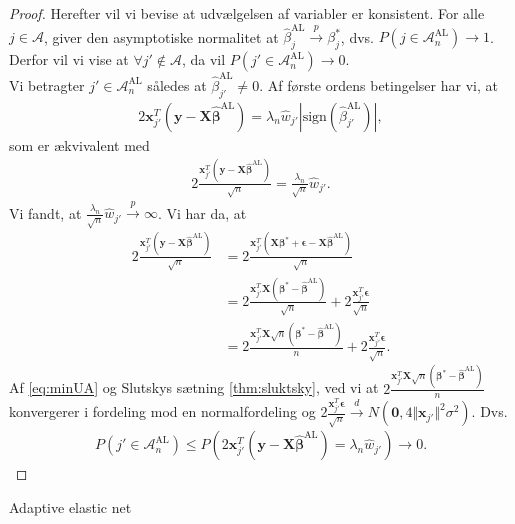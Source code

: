 \begin{proof}
Herefter vil vi bevise at udvælgelsen af variabler er konsistent. For alle $j \in \mathcal{A}$, giver den asymptotiske normalitet at $\hat{\beta}_j^{\text{AL}} \overset{p}{\rightarrow}\beta_j^{*}$, dvs. $P(j \in \mathcal{A}_n^{\text{AL}}) \rightarrow 1$. Derfor vil vi vise at $\forall j' \notin \mathcal{A}$, da vil $P(j' \in \mathcal{A}_n^{\text{AL}}) \rightarrow 0$. \\
Vi betragter $j' \in \mathcal{A}_n^{\text{AL}}$ således at $\hat{\beta}_{j'}^{\text{AL}} \neq 0$. Af første ordens betingelser har vi, at 
\begin{align*}
2 \mathbf{x}_{j'}^T  \left( \mathbf{y}-\mathbf{X}\hat{\boldsymbol{\beta}}^{\text{AL}} \right)=\lambda_n \hat{w}_{j'} \left\vert \text{sign}(\hat{\beta}_{j'}^\text{AL}) \right\vert,
\end{align*}
som er ækvivalent med
\begin{align*}
2 \frac{\mathbf{x}_{j'}^T \left( \mathbf{y}-\mathbf{X}\hat{\boldsymbol{\beta}}^{{\text{AL}}}\right)}{\sqrt{n}}=\frac{\lambda_n}{\sqrt{n}} \hat{w}_{j'}.
\end{align*}
Vi fandt, at $\frac{\lambda_n}{\sqrt{n}} \hat{w}_{j'} \overset{p}{\rightarrow} \infty$. Vi har da, at 
\begin{align*}
2 \frac{\mathbf{x}_{j'}^T \left(\mathbf{y}-\mathbf{X}\hat{\boldsymbol{\beta}}^{{\text{AL}}} \right)}{\sqrt{n}}
 &= 2 \frac{\mathbf{x}_{j'}^T \left(\mathbf{X}\boldsymbol{\beta}^*+\boldsymbol{\epsilon}-\mathbf{X}\hat{\boldsymbol{\beta}}^{{\text{AL}}} \right) }{\sqrt{n}} \\
&= 2 \frac{\mathbf{x}_{j'}^T \mathbf{X} \left(\boldsymbol{\beta}^*-\hat{\boldsymbol{\beta}}^{\text{AL}} \right)}{\sqrt{n}}+2\frac{\mathbf{x}_{j'}^T \boldsymbol{\epsilon}}{\sqrt{n}} \\
&= 2 \frac{\mathbf{x}_{j'}^T \mathbf{X} \sqrt{n} \left(\boldsymbol{\beta}^*-\hat{\boldsymbol{\beta}}^{\text{AL}}\right)}{n}+2\frac{\mathbf{x}_{j'}^T \boldsymbol{\epsilon}}{\sqrt{n}}.
\end{align*}
Af \eqref{eq:minUA} og Slutskys sætning \ref{thm:sluktsky}, ved vi at $ 2 \frac{\mathbf{x}_{j'}^T \mathbf{X} \sqrt{n} \left(\boldsymbol{\beta}^*-\hat{\boldsymbol{\beta}}^{\text{AL}}\right)}{n}$ konvergerer i fordeling mod en normalfordeling og $2\frac{\mathbf{x}_{j'}^T \boldsymbol{\epsilon}}{\sqrt{n}} \overset{d}{\rightarrow} N \left(\mathbf{0}, 4 \Vert \mathbf{x}_{j'} \Vert^2 \sigma^2 \right)$. Dvs.
\begin{align*}
P\left(j' \in \mathcal{A}_n^{\text{AL}}\right) \leq P\left(2 \mathbf{x}_{j'}^T \left(\mathbf{y}-\mathbf{X} \hat{\boldsymbol{\beta}}^{\text{AL}}\right)=\lambda_n \hat{w}_{j'} \right) \rightarrow 0.
\end{align*}
\end{proof}


Adaptive elastic net
